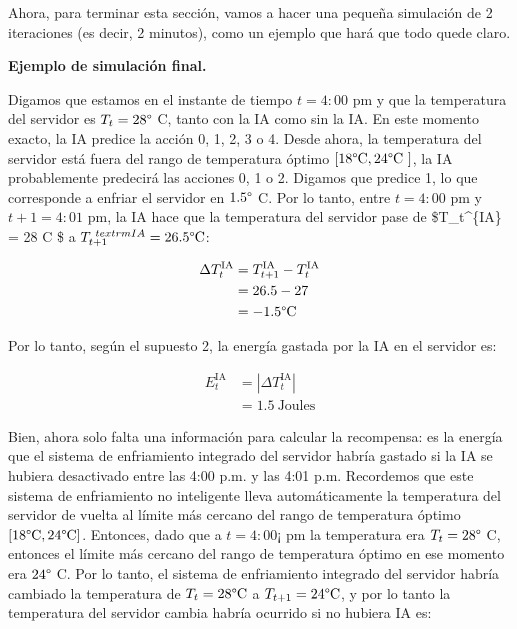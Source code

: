 \documentclass[]{book}
\begin{document}
Ahora, para terminar esta sección, vamos a hacer una pequeña simulación de 2 iteraciones (es decir, 2 minutos), como un ejemplo que hará que todo quede claro.

\textbf{Ejemplo de simulación final.}

Digamos que estamos en el instante de tiempo \(t = 4:00\) pm y que la temperatura del servidor es \(T_t = 28 \degree\) C, tanto con la IA como sin la IA. En este momento exacto, la IA predice la acción 0, 1, 2, 3 o 4. Desde ahora, la temperatura del servidor está fuera del rango de temperatura óptimo \([18 \degree \textrm{C}, 24 \degree \textrm{C }]\), la IA probablemente predecirá las acciones 0, 1 o 2. Digamos que predice 1, lo que corresponde a enfriar el servidor en \(1.5 \degree\) C. Por lo tanto, entre \(t = 4:00\) pm y \(t + 1 = 4: 01\) pm, la IA hace que la temperatura del servidor pase de \$T\_t\^{}\{\textrm{IA}\} = 28 \degree \textrm{C} \$ a \(T_{t + 1}^{\ textrm{IA}} = 26.5 \degree \textrm{C}\):

\begin{align*}
    \Delta T_t^{\textrm{IA}}
    & = T_{t+1}^{\textrm{IA}} - T_t^{\textrm{IA}} \\
    & = 26.5 - 27 \\
    & = -1.5 \degree \textrm{C}
\end{align*}

Por lo tanto, según el supuesto 2, la energía gastada por la IA en el servidor es:

\begin{align*}
    E_t^{\textrm{IA}}
    & = |\Delta T_t^{\textrm{IA}}| \\
    & = 1.5 \ \textrm{Joules}
\end{align*}

Bien, ahora solo falta una información para calcular la recompensa: es la energía que el sistema de enfriamiento integrado del servidor habría gastado si la IA se hubiera desactivado entre las 4:00 p.m. y las 4:01 p.m. Recordemos que este sistema de enfriamiento no inteligente lleva automáticamente la temperatura del servidor de vuelta al límite más cercano del rango de temperatura óptimo \([18 \degree \textrm{C}, 24 \degree \textrm{C}]\). Entonces, dado que a \(t = 4: 00 ¡\) pm la temperatura era \(T_t = 28 \degree\) C, entonces el límite más cercano del rango de temperatura óptimo en ese momento era \(24 \degree\) C. Por lo tanto, el sistema de enfriamiento integrado del servidor habría cambiado la temperatura de \(T_t = 28 \degree \textrm{C}\) a \(T_{t + 1} = 24 \degree \textrm{C}\), y por lo tanto la temperatura del servidor cambia habría ocurrido si no hubiera IA es:
\end{document}
